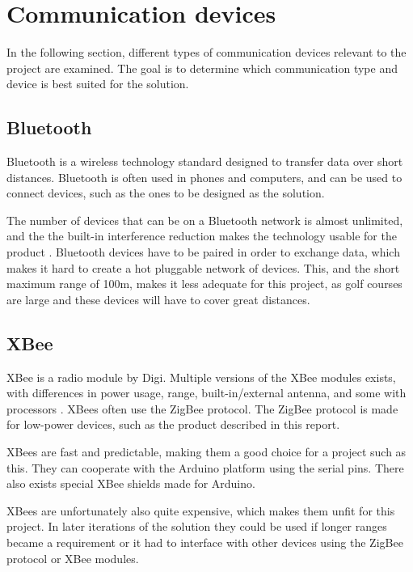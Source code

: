 \section{Communication devices}
In the following section, different types of communication devices relevant to the project are examined. The goal is to determine which communication type and device is best suited for the solution.

\subsection{Bluetooth}
Bluetooth is a wireless technology standard designed to transfer data over short distances. Bluetooth is often used in phones and computers, and can be used to connect devices, such as the ones to be designed as the solution. 

The number of devices that can be on a Bluetooth network is almost unlimited, and the the built-in interference reduction makes the technology usable for the product \cite{bluetoothbasics}.
Bluetooth devices have to be paired in order to exchange data, which makes it hard to create a hot pluggable network of devices. This, and the short maximum range of 100m\cite{bluetoothbasics}, makes it less adequate for this project, as golf courses are large and these devices will have to cover great distances.

\subsection{XBee}
XBee is a radio module by Digi. Multiple versions of the XBee modules exists, with differences in power usage, range, built-in/external antenna, and some with processors \cite{sparkfunXbeeGuide}.
XBees often use the ZigBee protocol. The ZigBee protocol is made for low-power devices, such as the product described in this report\cite{zigbee}.

XBees are fast and predictable, making them a good choice for a project such as this. They can cooperate with the Arduino platform using the serial pins. There also exists special XBee shields made for Arduino.

XBees are unfortunately also quite expensive, which makes them unfit for this project. In later iterations of the solution   they could be used if longer ranges became a requirement or it had to interface with other devices using the ZigBee protocol or XBee modules.

